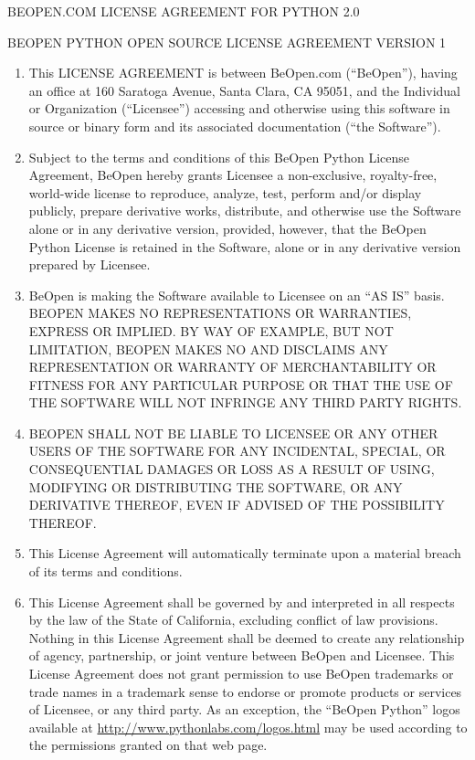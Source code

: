 \documentclass[letterpaper,10pt,english]{manual}
\begin{document}
\begin{center}BEOPEN.COM LICENSE AGREEMENT FOR PYTHON 2.0
\end{center}
\begin{center}BEOPEN PYTHON OPEN SOURCE LICENSE AGREEMENT VERSION 1
\end{center}\begin{enumerate}
\item {} 
This LICENSE AGREEMENT is between BeOpen.com (``BeOpen''), having an office at
160 Saratoga Avenue, Santa Clara, CA 95051, and the Individual or Organization
(``Licensee'') accessing and otherwise using this software in source or binary
form and its associated documentation (``the Software'').

\item {} 
Subject to the terms and conditions of this BeOpen Python License Agreement,
BeOpen hereby grants Licensee a non-exclusive, royalty-free, world-wide license
to reproduce, analyze, test, perform and/or display publicly, prepare derivative
works, distribute, and otherwise use the Software alone or in any derivative
version, provided, however, that the BeOpen Python License is retained in the
Software, alone or in any derivative version prepared by Licensee.

\item {} 
BeOpen is making the Software available to Licensee on an ``AS IS'' basis.
BEOPEN MAKES NO REPRESENTATIONS OR WARRANTIES, EXPRESS OR IMPLIED.  BY WAY OF
EXAMPLE, BUT NOT LIMITATION, BEOPEN MAKES NO AND DISCLAIMS ANY REPRESENTATION OR
WARRANTY OF MERCHANTABILITY OR FITNESS FOR ANY PARTICULAR PURPOSE OR THAT THE
USE OF THE SOFTWARE WILL NOT INFRINGE ANY THIRD PARTY RIGHTS.

\item {} 
BEOPEN SHALL NOT BE LIABLE TO LICENSEE OR ANY OTHER USERS OF THE SOFTWARE FOR
ANY INCIDENTAL, SPECIAL, OR CONSEQUENTIAL DAMAGES OR LOSS AS A RESULT OF USING,
MODIFYING OR DISTRIBUTING THE SOFTWARE, OR ANY DERIVATIVE THEREOF, EVEN IF
ADVISED OF THE POSSIBILITY THEREOF.

\item {} 
This License Agreement will automatically terminate upon a material breach of
its terms and conditions.

\item {} 
This License Agreement shall be governed by and interpreted in all respects
by the law of the State of California, excluding conflict of law provisions.
Nothing in this License Agreement shall be deemed to create any relationship of
agency, partnership, or joint venture between BeOpen and Licensee.  This License
Agreement does not grant permission to use BeOpen trademarks or trade names in a
trademark sense to endorse or promote products or services of Licensee, or any
third party.  As an exception, the ``BeOpen Python'' logos available at
\href{http://www.pythonlabs.com/logos.html}{http://www.pythonlabs.com/logos.html} may be used according to the permissions
granted on that web page.


\end{enumerate}
\end{document}
